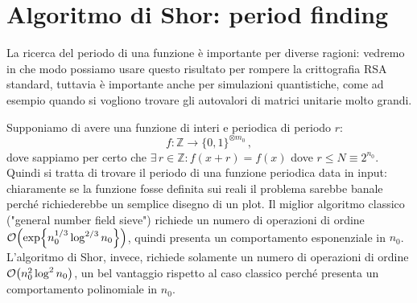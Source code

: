 \section{Algoritmo di Shor: period finding}
La ricerca del periodo di una funzione è importante per diverse ragioni: vedremo in che modo possiamo usare questo risultato per rompere la crittografia RSA standard, tuttavia è importante anche per simulazioni quantistiche, come ad esempio quando si vogliono trovare gli autovalori di matrici unitarie molto grandi. 

\noindent Supponiamo di avere una funzione di interi e periodica di periodo $r$:
\begin{equation*}
    f:\mathbb{Z}\rightarrow\{0,1\}^{\otimes m_0} \, ,
\end{equation*}
dove sappiamo per certo che $\exists \, r \in \mathbb{Z} : f(x+r)=f(x)$ dove $r \leq N \equiv 2^{n_0}$. Quindi si tratta di trovare il periodo di una funzione periodica data in input: chiaramente se la funzione fosse definita sui reali il problema sarebbe banale perché richiederebbe un semplice disegno di un plot. Il miglior algoritmo classico ("general number field sieve") richiede un numero di operazioni di ordine $\order{\exp{n_0^{1/3} \log^{2/3}n_0}}$, quindi presenta un comportamento esponenziale in $n_0$. L'algoritmo di Shor, invece, richiede solamente un numero di operazioni di ordine $\order{n_0^2\log^2n_0}$, un bel vantaggio rispetto al caso classico perché presenta un comportamento polinomiale in $n_0$. 

